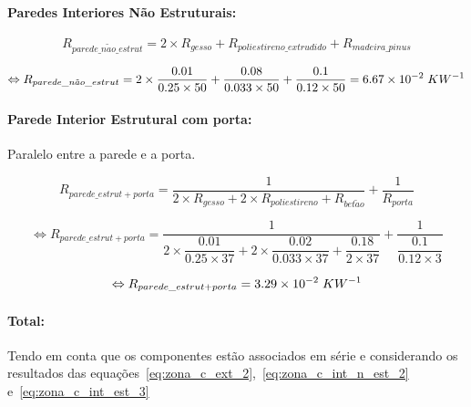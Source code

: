 \documentclass[12pt, a4paper]{article}
\begin{document}

\paragraph{Paredes Interiores Não Estruturais:}\label{par:zona_c_int_n_est}

\begin{equation}
	R_{parede\_n\tilde{a}o\_estrut} = 2 \times R_{gesso} + R_{poliestireno\_extrudido} + R_{madeira\_pinus}
	\label{eq:zona_c_int_n_est_1}
\end{equation}

\begin{equation}
	\Leftrightarrow R_{parede\_n\tilde{a}o\_estrut} =
	2 \times \dfrac{0.01}{0.25 \times 50} +
	\dfrac{0.08}{0.033 \times 50} +
	\dfrac{0.1}{0.12 \times 50} = 6.67 \times 10^{-2} \hspace{1mm} KW^{-1}
	\label{eq:zona_c_int_n_est_2}
\end{equation}

\paragraph{Parede Interior Estrutural com porta:}\label{par:zona_c_int_est}Paralelo entre a parede e a porta.

\begin{equation}
	R_{parede\_estrut + porta} =
	\dfrac{1}{
		2 \times R_{gesso} + 2 \times R_{poliestireno} + R_{bet\tilde{a}o}
	}
	+
	\dfrac{1}{
		R_{porta}
	}
	\label{eq:zona_c_int_est_1}
\end{equation}

\begin{equation}
	\Leftrightarrow R_{parede\_estrut + porta} =
	\dfrac{1}{
		2 \times \dfrac{0.01}{0.25 \times 37} +
		2 \times \dfrac{0.02}{0.033 \times 37} +
		\dfrac{0.18}{2 \times 37}
	}
	+
	\dfrac{1}{
		\dfrac{0.1}{0.12 \times 3}
	}
	\label{eq:zona_c_int_est_2}
\end{equation}

\begin{equation}
	\Leftrightarrow R_{parede\_estrut + porta} = 3.29 \times 10^{-2} \hspace{1mm} KW^{-1}
	\label{eq:zona_c_int_est_3}
\end{equation}

\paragraph{Total:}\label{par:zona_c_total:} Tendo em conta que os componentes est\~ao
associados em série e considerando os resultados das
equa\c{c}\~oes~\ref{eq:zona_c_ext_2},~\ref{eq:zona_c_int_n_est_2} e~\ref{eq:zona_c_int_est_3}
\end{document}
